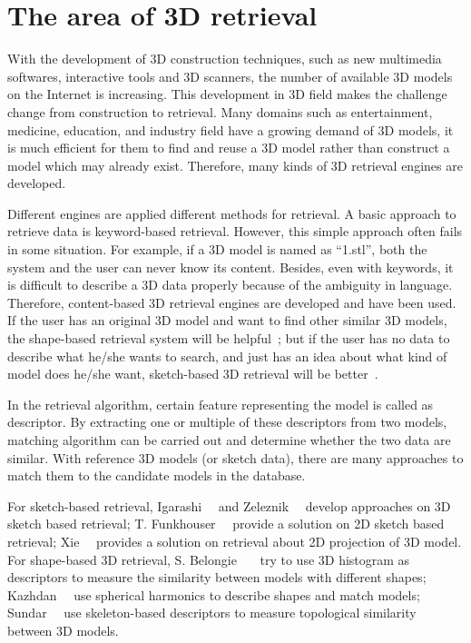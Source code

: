 \section{The area of 3D retrieval}
With the development of 3D construction techniques, such as new multimedia softwares, interactive tools and 3D scanners, the number of available 3D models on the Internet is increasing. This development in 3D field makes the challenge change from construction to retrieval. Many domains such as entertainment, medicine, education, and industry field have a growing demand of 3D models, it is much efficient for them to find and reuse a 3D model rather than construct a model which may already exist. Therefore, many kinds of 3D retrieval engines are developed.

Different engines are applied different methods for retrieval. A basic approach to retrieve data is keyword-based retrieval. However, this simple approach often fails in some situation. For example, if a 3D model is named as ``1.stl'', both the system and the user can never know its content. Besides, even with keywords, it is difficult to describe a 3D data properly because of the ambiguity in language. Therefore, content-based 3D retrieval engines are developed and have been used. If the user has an original 3D model and want to find other similar 3D models, the shape-based retrieval system will be helpful~\cite{Funkhouser:2003:SEM:588272.588279}; but if the user has no data to describe what he/she wants to search, and just has an idea about what kind of model does he/she want, sketch-based 3D retrieval will be better~\cite{CGF:CGF12200}. 

In the retrieval algorithm, certain feature representing the model is called as descriptor. By extracting one or multiple of these descriptors from two models, matching algorithm can be carried out and determine whether the two data are similar. With reference 3D models (or sketch data), there are many approaches to match them to the candidate models in the database. 

For sketch-based retrieval, Igarashi~\etal~\cite{Igarashi:2007:TSI:1281500.1281532} and Zeleznik~\etal~\cite{Zeleznik:2007:SIS:1281500.1281530} develop approaches on 3D sketch based retrieval; T. Funkhouser~\etal~\cite{Funkhouser:2003:SEM:588272.588279} provide a solution on 2D sketch based retrieval; Xie~\etal~\cite{CGF:CGF12200} provides a solution on retrieval about 2D projection of 3D model. For shape-based 3D retrieval, S. Belongie~\etal~\cite{belongie2001matching}~\cite{belongie2002shape} try to use 3D histogram as descriptors to measure the similarity between models with different shapes; Kazhdan~\etal~\cite{kazhdan2003rotation} use spherical harmonics to describe shapes and match models; Sundar~\etal~\cite{sundar2003skeleton} use skeleton-based descriptors to measure topological similarity between 3D models. 

